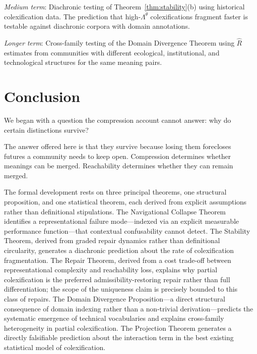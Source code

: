 \documentclass[12pt]{article}
\theoremstyle{rthm}
\theoremstyle{rdef}
\theoremstyle{remark}
\newcommand{\Lam}[1][\theta]{\Lambda^{#1}}
\begin{document}
\emph{Medium term}: Diachronic testing of Theorem~\ref{thm:stability}(b) using
historical colexification data. The prediction that high-$\Lam$ colexifications
fragment faster is testable against diachronic corpora with domain annotations.

\emph{Longer term}: Cross-family testing of the Domain Divergence Theorem using
$\widehat{R}$ estimates from communities with different ecological, institutional,
and technological structures for the same meaning pairs.

\section{Conclusion}
\label{sec:conclusion}

We began with a question the compression account cannot answer: why do certain
distinctions survive?

The answer offered here is that they survive because losing them forecloses
futures a community needs to keep open. Compression determines whether meanings
can be merged. Reachability determines whether they can remain merged.

The formal development rests on three principal theorems, one structural
proposition, and one statistical theorem, each derived from explicit assumptions
rather than definitional stipulations. The Navigational Collapse Theorem
identifies a representational failure mode---indexed via an explicit measurable
performance function---that contextual confusability cannot detect. The Stability
Theorem, derived from graded repair dynamics rather than definitional circularity,
generates a diachronic prediction about the rate of colexification fragmentation.
The Repair Theorem, derived from a cost trade-off between representational
complexity and reachability loss, explains why partial colexification is the
preferred admissibility-restoring repair rather than full differentiation; the
scope of the uniqueness claim is precisely bounded to this class of repairs.
The Domain Divergence Proposition---a direct structural consequence of domain
indexing rather than a non-trivial derivation---predicts the systematic emergence
of technical vocabularies and explains cross-family heterogeneity in partial
colexification. The Projection Theorem generates a directly falsifiable prediction
about the interaction term in the best existing statistical model of
colexification.
\end{document}
